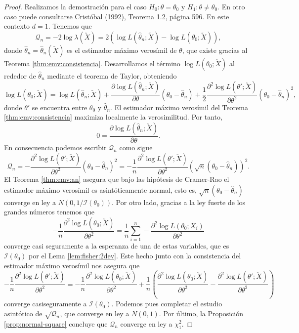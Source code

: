         \begin{proof}
            Realizamos la demostración para el caso $H_0: \theta = \theta_0$ y $H_1: \theta \ne \theta_0$. En otro caso puede consultarse Cristóbal (1992), Teorema 1.2, página 596. En este contexto $d = 1$. Tenemos que
            \[\mathcal{Q}_n = -2 \log \lambda(\utilde{X}) = 2 (\log L(\hat{\theta}_n; \utilde{X}) - \log L(\theta_0; \utilde{X})),\]
            donde $\hat{\theta}_n = \hat{\theta}_n(\utilde{X})$ es el estimador máximo verosímil de $\theta$, que existe gracias al Teorema \ref{thm:emv:consistencia}. Desarrollamos el término $\log L(\theta_0; \utilde{X})$ al rededor de $\hat{\theta}_n$ mediante el teorema de Taylor, obteniendo
            \[\log L(\theta_0; \utilde{X}) = \log L(\hat{\theta}_n; \utilde{X}) + \frac{\partial \log L(\hat{\theta}_n; \utilde{X})}{\partial \theta}(\theta_0 -  \hat{\theta}_n) + \frac{1}{2} \frac{\partial^2 \log L(\theta'; \utilde{X})}{\partial \theta^2}(\theta_0 -  \hat{\theta}_n)^2,\]
            donde $\theta'$ se encuentra entre $\theta_0$ y $\hat{\theta}_n$. El estimador máximo verosímil del Teorema \ref{thm:emv:consistencia} maximiza localmente la verosimilitud. Por tanto,
            \[0 = \frac{\partial \log L(\hat{\theta}_n; \utilde{X})}{\partial \theta}.\]
            En consecuencia podemos escribir $\mathcal{Q}_n$ como sigue
            \[\mathcal{Q}_n = - \frac{\partial^2 \log L(\theta'; \utilde{X})}{\partial \theta^2}(\theta_0 -  \hat{\theta}_n)^2 = - \frac{1}{n} \frac{\partial^2 \log L(\theta'; \utilde{X})}{\partial \theta^2}(\sqrt{n}(\theta_0 -  \hat{\theta}_n))^2.\]
            El Teorema \ref{thm:emv:an} asegura que bajo las hipótesis de Cramer-Rao el estimador máximo verosímil es asintóticamente normal, esto es, $\sqrt{n}(\theta_0 -  \hat{\theta}_n)$ converge en ley a $N(0, 1/\mathcal{I}(\theta_0))$. Por otro lado, gracias a la ley fuerte de los grandes números tenemos que
            \[- \frac{1}{n} \frac{\partial^2 \log L(\theta_0; \utilde{X})}{\partial \theta^2} = \frac{1}{n} \sum_{i = 1}^n - \frac{\partial^2 \log L(\theta_0; X_i)}{\partial \theta^2}\]
            converge casi seguramente a la esperanza de una de estas variables, que es $\mathcal{I}(\theta_0)$ por el Lema \ref{lem:fisher:2dev}. Este hecho junto con la consistencia del estimador máximo verosímil nos asegura que
            \[- \frac{1}{n} \frac{\partial^2 \log L(\theta'; \utilde{X})}{\partial \theta^2} = - \frac{1}{n} \frac{\partial^2 \log L(\theta_0; \utilde{X})}{\partial \theta^2} + \frac{1}{n}\left(\frac{\partial^2 \log L(\theta_0; \utilde{X})}{\partial \theta^2} -  \frac{\partial^2 \log L(\theta'; \utilde{X})}{\partial \theta^2}\right)\]
            converge casiseguramente a $\mathcal{I}(\theta_0)$. Podemos pues completar el estudio asintótico de $\sqrt{\mathcal{Q}_n}$, que converge en ley a $N(0, 1)$. Por último, la Proposición \ref{prop:normal-square} concluye que $\mathcal{Q}_n$ converge en ley a $\chi_1^2$.
        \end{proof}

